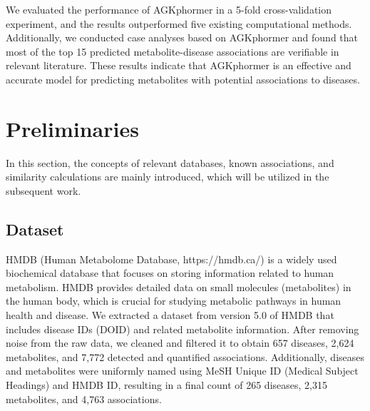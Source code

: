 \documentclass[lettersize,journal]{IEEEtran}
\begin{document}
We evaluated the performance of AGKphormer in a 5-fold cross-validation experiment, and the results outperformed five existing computational methods. Additionally, we conducted case analyses based on AGKphormer and found that most of the top 15 predicted metabolite-disease associations are verifiable in relevant literature. These results indicate that AGKphormer is an effective and accurate model for predicting metabolites with potential associations to diseases.

\section{\textbf{Preliminaries}}\label{sec2}
In this section, the concepts of relevant databases, known associations, and similarity calculations are mainly introduced, which will be utilized in the subsequent work.

\subsection{\textbf{Dataset}}
HMDB (Human Metabolome Database, https://hmdb.ca/)\cite{wishart2022hmdb} is a widely used biochemical database that focuses on storing information related to human metabolism. HMDB provides detailed data on small molecules (metabolites) in the human body, which is crucial for studying metabolic pathways in human health and disease.
We extracted a dataset from version 5.0 of HMDB that includes disease IDs (DOID) and related metabolite information. After removing noise from the raw data, we cleaned and filtered it to obtain 657 diseases, 2,624 metabolites, and 7,772 detected and quantified associations. Additionally, diseases and metabolites were uniformly named using MeSH Unique ID (Medical Subject Headings) \cite{lipscomb2000medical} and HMDB ID, resulting in a final count of 265 diseases, 2,315 metabolites, and 4,763 associations. 
\end{document}
